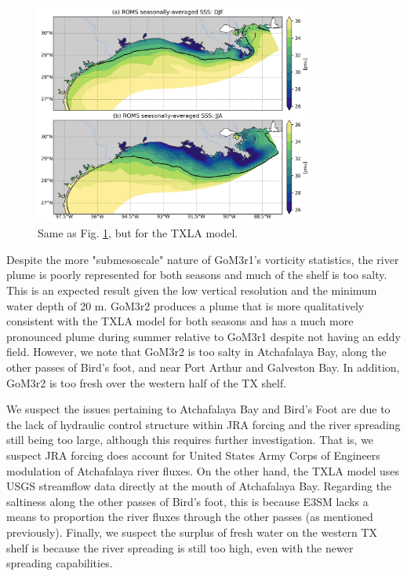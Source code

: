 \begin{figure}[t]
\centerline{\includegraphics[width=0.82\textwidth]{figures/scgsr/txla_sss_mean.jpg}}
    \caption{Same as Fig. \ref{fig:ROMS_sss}, but for the TXLA model.}
    \label{fig:ROMS_sss}
\end{figure}

Despite the more "submesoscale" nature of GoM3r1's vorticity statistics, the river plume is poorly represented for both seasons and much of the shelf is too salty. This is an expected result given the low vertical resolution and the minimum water depth of 20 m. GoM3r2 produces a plume that is more qualitatively consistent with the TXLA model for both seasons and has a much more pronounced plume during summer relative to GoM3r1 despite not having an eddy field. However, we note that GoM3r2 is too salty in Atchafalaya Bay, along the other passes of Bird's foot, and near Port Arthur and Galveston Bay. In addition, GoM3r2 is too fresh over the western half of the TX shelf. 

We suspect the issues pertaining to Atchafalaya Bay and Bird's Foot are due to the lack of hydraulic control structure within JRA forcing and the river spreading still being too large, although this requires further investigation. That is, we suspect JRA forcing does account for United States Army Corps of Engineers modulation of Atchafalaya river fluxes. On the other hand, the TXLA model uses USGS streamflow data directly at the mouth of Atchafalaya Bay. Regarding the saltiness along the other passes of Bird's foot, this is because E3SM lacks a means to proportion the river fluxes through the other passes (as mentioned previously). Finally, we suspect the surplus of fresh water on the western TX shelf is because the river spreading is still too high, even with the newer spreading capabilities.

